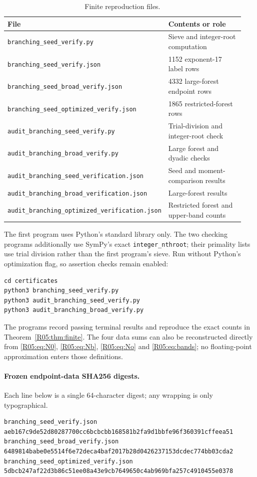 \documentclass[11pt,a4paper]{article}
\theoremstyle{definition}\newtheorem{definition}[theorem]{Definition}
\theoremstyle{remark}\newtheorem{remark}[theorem]{Remark}
\begin{document}
\begin{table}[htbp]
\centering\small
\caption{Finite reproduction files.}\label{R05:tab:files}
\begin{tabular}{@{}p{0.58\linewidth}p{0.36\linewidth}@{}}
\toprule
File&Contents or role\\\midrule
\texttt{branching\_seed\_verify.py}&Sieve and integer-root computation\\
\texttt{branching\_seed\_verify.json}&1152 exponent-17 label rows\\
\texttt{branching\_seed\_broad\_verify.json}&4332 large-forest endpoint rows\\
\texttt{branching\_seed\_optimized\_verify.json}&1865 restricted-forest rows\\
\texttt{audit\_branching\_seed\_verify.py}&Trial-division and integer-root check\\
\texttt{audit\_branching\_broad\_verify.py}&Large forest and dyadic checks\\
\texttt{audit\_branching\_seed\_verification.json}&Seed and moment-comparison results\\
\texttt{audit\_branching\_broad\_verification.json}&Large-forest results\\
\texttt{audit\_branching\_optimized\_verification.json}&Restricted forest and upper-band counts\\
\bottomrule
\end{tabular}
\end{table}

The first program uses Python's standard library only. The two
checking programs additionally use SymPy's exact
\texttt{integer\_nthroot}; their primality lists use trial division
rather than the first program's sieve. Run without Python's
optimization flag, so assertion checks remain enabled:
\begin{lstlisting}
cd certificates
python3 branching_seed_verify.py
python3 audit_branching_seed_verify.py
python3 audit_branching_broad_verify.py
\end{lstlisting}
The programs record passing terminal results and reproduce the
exact counts in Theorem~\ref{R05:thm:finite}.
The four data sums can also be reconstructed directly from
\eqref{R05:eq:N0}, \eqref{R05:eq:Nb}, \eqref{R05:eq:No} and \eqref{R05:eq:bands};
no floating-point approximation enters those definitions.

\paragraph{Frozen endpoint-data SHA256 digests.}
Each line below is a single 64-character digest; any wrapping is
only typographical.
\begin{lstlisting}
branching_seed_verify.json
aeb167c9de52d80287700cc6bcbcbb168581b2fa9d1bbfe96f360391cffeea51
branching_seed_broad_verify.json
6489814babe0e5514f6e72deca4baf2017b28d0426237153dcdec774bb03cda2
branching_seed_optimized_verify.json
5dbcb247af22d3b86c51ee08a43e9cb7649650c4ab969bfa257c4910455e0378
\end{lstlisting}
\end{document}
